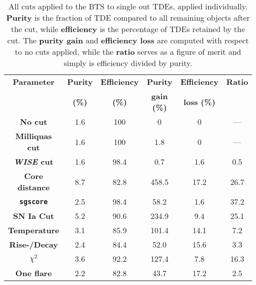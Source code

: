 \begin{table}
  \centering
  \def\arraystretch{1.2}
  \begin{tabular}{c c c c c c}
    \hline
    \textbf{Parameter}         & \textbf{Purity} & \textbf{Efficiency} & \textbf{Purity}    & \textbf{Efficiency} & \textbf{Ratio} \\
                               & \textbf{(\%)}   & \textbf{(\%)}       & \textbf{gain (\%)} & \textbf{loss (\%)}  &                \\
    \hline
    \hline
    \textbf{No cut}            & 1.6             & 100                 & 0                  & 0                   & ---            \\
    \textbf{Milliquas cut}     & 1.6             & 100                 & 1.8                & 0                   & ---            \\
    \textbf{\textit{WISE} cut} & 1.6             & 98.4                & 0.7                & 1.6                 & 0.5            \\
    \textbf{Core distance}     & 8.7             & 82.8                & 458.5              & 17.2                & 26.7           \\
    \textbf{\texttt{sgscore}}  & 2.5             & 98.4                & 58.2               & 1.6                 & 37.2           \\
    \textbf{SN Ia Cut}         & 5.2             & 90.6                & 234.9              & 9.4                 & 25.1           \\
    \textbf{Temperature}       & 3.1             & 85.9                & 101.4              & 14.1                & 7.2            \\
    \textbf{Rise-/Decay}       & 2.4             & 84.4                & 52.0               & 15.6                & 3.3            \\
    \textbf{$\chi^2$}          & 3.6             & 92.2                & 127.4              & 7.8                 & 16.3           \\
    \textbf{One flare}         & 2.2             & 82.8                & 43.7               & 17.2                & 2.5            \\
    \hline
  \end{tabular}
  \caption[BTS visual cuts]{All cuts applied to the BTS to single out TDEs, applied individually. \textbf{Purity} is the fraction of TDE compared to all remaining objects after the cut, while \textbf{efficiency} is the percentage of TDEs retained by the cut. The \textbf{purity gain} and \textbf{efficiency loss} are computed with respect to no cuts applied, while the \textbf{ratio} serves as a figure of merit and simply is efficiency divided by purity.}
  \label{tab:visual_selection}
\end{table}

